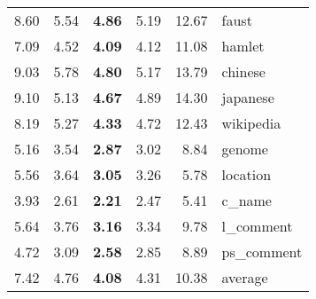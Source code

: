 {\begin{tabular}{|rrrr|r|l|}
{\footnotesize{ 8.60}}& {\footnotesize{ 5.54}}& {\footnotesize{\bf  4.86}}& {\footnotesize{ 5.19}}& {\footnotesize{12.67}}& {\footnotesize faust}\\
{\footnotesize{ 7.09}}& {\footnotesize{ 4.52}}& {\footnotesize{\bf  4.09}}& {\footnotesize{ 4.12}}& {\footnotesize{11.08}}& {\footnotesize hamlet}\\
{\footnotesize{ 9.03}}& {\footnotesize{ 5.78}}& {\footnotesize{\bf  4.80}}& {\footnotesize{ 5.17}}& {\footnotesize{13.79}}& {\footnotesize chinese}\\
{\footnotesize{ 9.10}}& {\footnotesize{ 5.13}}& {\footnotesize{\bf  4.67}}& {\footnotesize{ 4.89}}& {\footnotesize{14.30}}& {\footnotesize japanese}\\
{\footnotesize{ 8.19}}& {\footnotesize{ 5.27}}& {\footnotesize{\bf  4.33}}& {\footnotesize{ 4.72}}& {\footnotesize{12.43}}& {\footnotesize wikipedia}\\
{\footnotesize{ 5.16}}& {\footnotesize{ 3.54}}& {\footnotesize{\bf  2.87}}& {\footnotesize{ 3.02}}& {\footnotesize{ 8.84}}& {\footnotesize genome}\\
{\footnotesize{ 5.56}}& {\footnotesize{ 3.64}}& {\footnotesize{\bf  3.05}}& {\footnotesize{ 3.26}}& {\footnotesize{ 5.78}}& {\footnotesize location}\\
{\footnotesize{ 3.93}}& {\footnotesize{ 2.61}}& {\footnotesize{\bf  2.21}}& {\footnotesize{ 2.47}}& {\footnotesize{ 5.41}}& {\footnotesize c\_name}\\
{\footnotesize{ 5.64}}& {\footnotesize{ 3.76}}& {\footnotesize{\bf  3.16}}& {\footnotesize{ 3.34}}& {\footnotesize{ 9.78}}& {\footnotesize l\_comment}\\
{\footnotesize{ 4.72}}& {\footnotesize{ 3.09}}& {\footnotesize{\bf  2.58}}& {\footnotesize{ 2.85}}& {\footnotesize{ 8.89}}& {\footnotesize ps\_comment}\\
\hline
{\footnotesize{ 7.42}}& {\footnotesize{ 4.76}}& {\footnotesize{\bf  4.08}}& {\footnotesize{ 4.31}}& {\footnotesize{10.38}}& {\footnotesize average}\\
\hline
\end{tabular}}
